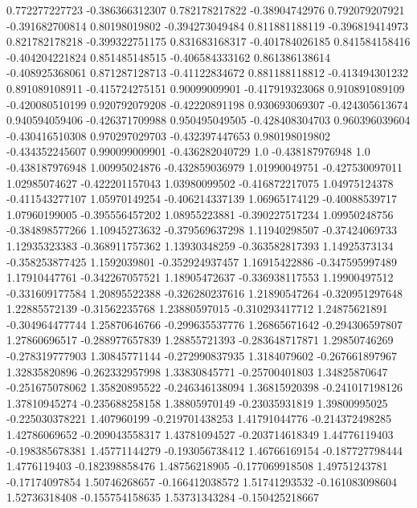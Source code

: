  0.772277227723  -0.386366312307
 0.782178217822   -0.38904742976
 0.792079207921  -0.391682700814
  0.80198019802  -0.394273049484
 0.811881188119  -0.396819414973
 0.821782178218  -0.399322751175
 0.831683168317  -0.401784026185
 0.841584158416  -0.404204221824
 0.851485148515  -0.406584333162
 0.861386138614  -0.408925368061
 0.871287128713   -0.41122834672
 0.881188118812  -0.413494301232
 0.891089108911  -0.415724275151
  0.90099009901  -0.417919323068
 0.910891089109  -0.420080510199
 0.920792079208   -0.42220891198
 0.930693069307  -0.424305613674
 0.940594059406  -0.426371709988
 0.950495049505  -0.428408304703
 0.960396039604  -0.430416510308
 0.970297029703  -0.432397447653
 0.980198019802  -0.434352245607
 0.990099009901  -0.436282040729
            1.0  -0.438187976948
            1.0  -0.438187976948
  1.00995024876  -0.432859036979
  1.01990049751  -0.427530097011
  1.02985074627  -0.422201157043
  1.03980099502  -0.416872217075
  1.04975124378  -0.411543277107
  1.05970149254  -0.406214337139
  1.06965174129   -0.40088539717
  1.07960199005  -0.395556457202
  1.08955223881  -0.390227517234
  1.09950248756  -0.384898577266
  1.10945273632  -0.379569637298
  1.11940298507   -0.37424069733
  1.12935323383  -0.368911757362
  1.13930348259  -0.363582817393
  1.14925373134  -0.358253877425
   1.1592039801  -0.352924937457
  1.16915422886  -0.347595997489
  1.17910447761  -0.342267057521
  1.18905472637  -0.336938117553
  1.19900497512  -0.331609177584
  1.20895522388  -0.326280237616
  1.21890547264  -0.320951297648
  1.22885572139   -0.31562235768
  1.23880597015  -0.310293417712
  1.24875621891  -0.304964477744
  1.25870646766  -0.299635537776
  1.26865671642  -0.294306597807
  1.27860696517  -0.288977657839
  1.28855721393  -0.283648717871
  1.29850746269  -0.278319777903
  1.30845771144  -0.272990837935
   1.3184079602  -0.267661897967
  1.32835820896  -0.262332957998
  1.33830845771   -0.25700401803
  1.34825870647  -0.251675078062
  1.35820895522  -0.246346138094
  1.36815920398  -0.241017198126
  1.37810945274  -0.235688258158
  1.38805970149   -0.23035931819
  1.39800995025  -0.225030378221
    1.407960199  -0.219701438253
  1.41791044776  -0.214372498285
  1.42786069652  -0.209043558317
  1.43781094527  -0.203714618349
  1.44776119403  -0.198385678381
  1.45771144279  -0.193056738412
  1.46766169154  -0.187727798444
   1.4776119403  -0.182398858476
  1.48756218905  -0.177069918508
  1.49751243781   -0.17174097854
  1.50746268657  -0.166412038572
  1.51741293532  -0.161083098604
  1.52736318408  -0.155754158635
  1.53731343284  -0.150425218667
